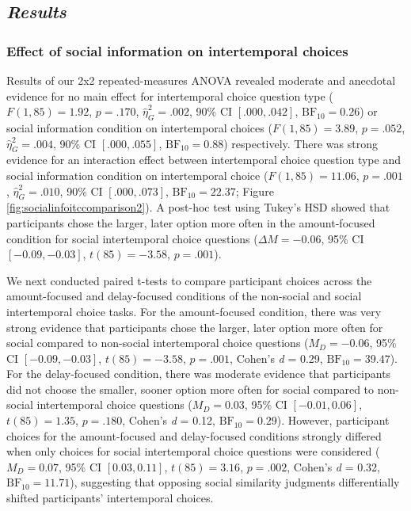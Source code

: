 \documentclass[
  pub,floatsintext]{apa6}
\begin{document}
\hypertarget{results-1}{%
\subsection{\texorpdfstring{\emph{Results}}{Results}}\label{results-1}}

\hypertarget{effect-of-social-information-on-intertemporal-choices-1}{%
\subsubsection{Effect of social information on intertemporal choices}\label{effect-of-social-information-on-intertemporal-choices-1}}

Results of our 2x2 repeated-measures ANOVA revealed moderate and anecdotal evidence for no main effect for intertemporal choice question type (\(F(1, 85) = 1.92\), \(p = .170\), \(\hat{\eta}^2_G = .002\), 90\% CI \([.000, .042]\), \(\mathrm{BF}_{\textrm{10}} = 0.26\)) or social information condition on intertemporal choices (\(F(1, 85) = 3.89\), \(p = .052\), \(\hat{\eta}^2_G = .004\), 90\% CI \([.000, .055]\), \(\mathrm{BF}_{\textrm{10}} = 0.88\)) respectively. There was strong evidence for an interaction effect between intertemporal choice question type and social information condition on intertemporal choice (\(F(1, 85) = 11.06\), \(p = .001\), \(\hat{\eta}^2_G = .010\), 90\% CI \([.000, .073]\), \(\mathrm{BF}_{\textrm{10}} = 22.37\); Figure \ref{fig:socialinfoitccomparison2}). A post-hoc test using Tukey's HSD showed that participants chose the larger, later option more often in the amount-focused condition for social intertemporal choice questions (\(\Delta M = -0.06\), 95\% CI \([-0.09, -0.03]\), \(t(85) = -3.58\), \(p = .001\)).

We next conducted paired t-tests to compare participant choices across the amount-focused and delay-focused conditions of the non-social and social intertemporal choice tasks. For the amount-focused condition, there was very strong evidence that participants chose the larger, later option more often for social compared to non-social intertemporal choice questions (\(M_D = -0.06\), 95\% CI \([-0.09, -0.03]\), \(t(85) = -3.58\), \(p = .001\), Cohen's \emph{d} = 0.29, \(\mathrm{BF}_{\textrm{10}} = 39.47\)). For the delay-focused condition, there was moderate evidence that participants did not choose the smaller, sooner option more often for social compared to non-social intertemporal choice questions (\(M_D = 0.03\), 95\% CI \([-0.01, 0.06]\), \(t(85) = 1.35\), \(p = .180\), Cohen's \emph{d} = 0.12, \(\mathrm{BF}_{\textrm{10}} = 0.29\)). However, participant choices for the amount-focused and delay-focused conditions strongly differed when only choices for social intertemporal choice questions were considered (\(M_D = 0.07\), 95\% CI \([0.03, 0.11]\), \(t(85) = 3.16\), \(p = .002\), Cohen's \emph{d} = 0.32, \(\mathrm{BF}_{\textrm{10}} = 11.71\)), suggesting that opposing social similarity judgments differentially shifted participants' intertemporal choices.
\end{document}
